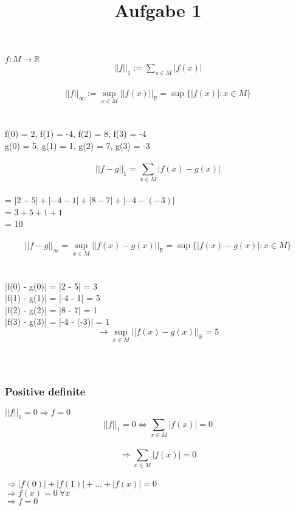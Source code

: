 \documentclass{article}
\title{Aufgabe 1}
\date{}
\begin{document}
\maketitle

\section{}
\subsection{}
$f: M \rightarrow \mathbb{R}$\\
\noindent
\begin{align*}
||f||_1 := \sum_{x \in M}{|f(x)|}
\end{align*}\\
\[||f||_\infty := \sup_{x \in M} ||f(x)||_\mathbb{R} = \sup \{|f(x)| : x \in M\}\]\\
\\
f(0) = 2, f(1) = -4, f(2) = 8, f(3) = -4\\
g(0) = 5, g(1) = 1, g(2) = 7, g(3) = -3\\
\\
\[||f-g||_1 = \sum_{x \in M}{|f(x) - g(x)|}\]\\
= $| 2-5| + |-4 -1| + |8-7| + |-4 - (-3)|$\\
= $ 3 + 5 + 1 + 1$\\
= 10\\
\\
\[||f-g||_\infty = \sup_{x \in M} ||f(x) - g(x)||_\mathbb{R} = \sup \{|f(x) - g(x)| : x\in M\}\]\\
\\
|f(0) - g(0)| = |2 - 5| = 3\\
|f(1) - g(1)| = |-4 - 1| = 5\\
|f(2) - g(2)| = |8 - 7| = 1 \\
|f(3) - g(3)| = |-4 - (-3)| = 1\\
\[\rightarrow \sup_{x \in M} ||f(x) - g(x)||_\mathbb{R} = 5\]\\
\\
\subsection{}
\subsubsection{Positive definite}
$||f||_1 = 0 \Rightarrow f = 0$\\
\[||f||_1 =  0 \Leftrightarrow \sum_{x \in M}{|f(x)|} = 0\] \\
\[ \Rightarrow \sum_{x \in M} {|f(x)|} = 0\] \\
$ \Rightarrow| f(0)| + |f(1)| + ... + |f(x)| = 0$ \\
$ \Rightarrow f(x) = 0~\forall x$ \\
$\Rightarrow f = 0$
\end{document}
